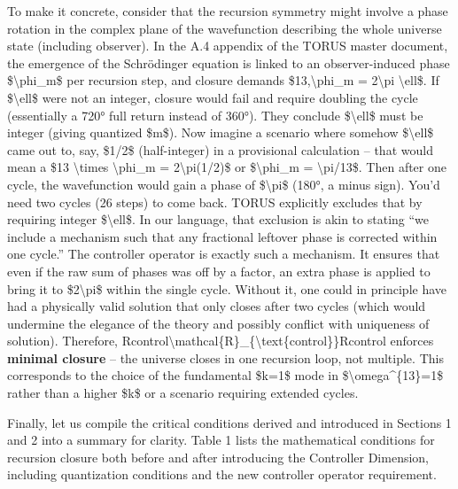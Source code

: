 \documentclass[
]{article}
\begin{document}
To make it concrete, consider that the recursion symmetry might involve
a phase rotation in the complex plane of the wavefunction describing the
whole universe state (including observer). In the A.4 appendix of the
TORUS master document, the emergence of the Schrödinger equation is
linked to an observer-induced phase \$\textbackslash phi\_m\$ per
recursion step, and closure demands \$13,\textbackslash phi\_m =
2\textbackslash pi \textbackslash ell\$\hspace{0pt}. If
\$\textbackslash ell\$ were not an integer, closure would fail and
require doubling the cycle (essentially a 720° full return instead of
360°)\hspace{0pt}. They conclude \$\textbackslash ell\$ must be integer
(giving quantized \$m\$)\hspace{0pt}. Now imagine a scenario where
somehow \$\textbackslash ell\$ came out to, say, \$1/2\$ (half-integer)
in a provisional calculation -- that would mean a \$13
\textbackslash times \textbackslash phi\_m = 2\textbackslash pi(1/2)\$
or \$\textbackslash phi\_m = \textbackslash pi/13\$. Then after one
cycle, the wavefunction would gain a phase of \$\textbackslash pi\$
(180°, a minus sign). You'd need two cycles (26 steps) to come back.
TORUS explicitly excludes that by requiring integer
\$\textbackslash ell\$\hspace{0pt}. In our language, that exclusion is
akin to stating ``we include a mechanism such that any fractional
leftover phase is corrected within one cycle.'' The controller operator
is exactly such a mechanism. It ensures that even if the raw sum of
phases was off by a factor, an extra phase is applied to bring it to
\$2\textbackslash pi\$ within the single cycle. Without it, one could in
principle have had a physically valid solution that only closes after
two cycles (which would undermine the elegance of the theory and
possibly conflict with uniqueness of solution). Therefore,
Rcontrol\textbackslash mathcal\{R\}\_\{\textbackslash text\{control\}\}Rcontrol\hspace{0pt}
enforces \textbf{minimal closure} -- the universe closes in one
recursion loop, not multiple. This corresponds to the choice of the
fundamental \$k=1\$ mode in \$\textbackslash omega\^{}\{13\}=1\$ rather
than a higher \$k\$ or a scenario requiring extended cycles\hspace{0pt}.

Finally, let us compile the critical conditions derived and introduced
in Sections 1 and 2 into a summary for clarity. Table 1 lists the
mathematical conditions for recursion closure both before and after
introducing the Controller Dimension, including quantization conditions
and the new controller operator requirement.
\end{document}

